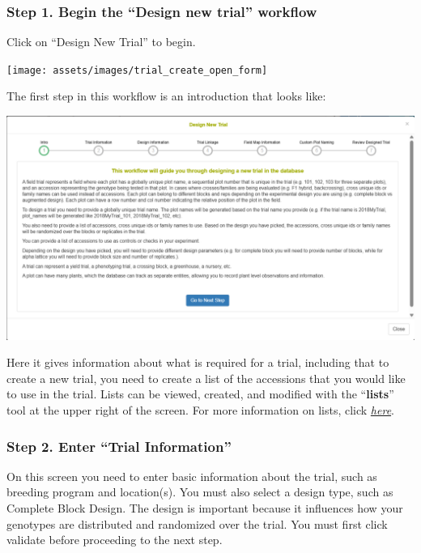 \documentclass[
  12pt,
]{book}
\begin{document}
\hypertarget{step-1.-begin-the-design-new-trial-workflow}{%
\subsubsection*{Step 1. Begin the ``Design new trial'' workflow}\label{step-1.-begin-the-design-new-trial-workflow}}


Click on ``Design New Trial'' to begin.

\begin{center}\texttt{[image: assets/images/trial\_create\_open\_form]} \end{center}

The first step in this workflow is an introduction that looks like:

\begin{center}\includegraphics[width=0.95\linewidth]{assets/images/trial_create_form_1} \end{center}

Here it gives information about what is required for a trial, including that to create a new trial, you need to create a list of the accessions that you would like to use in the trial. Lists can be viewed, created, and modified with the ``\textbf{lists}'' tool at the upper right of the screen. For more information on lists, click \protect\hyperlink{working-with-lists}{\emph{here}}.

\hypertarget{step-2.-enter-trial-information}{%
\subsubsection*{Step 2. Enter ``Trial Information''}\label{step-2.-enter-trial-information}}


On this screen you need to enter basic information about the trial, such as breeding program and location(s). You must also select a design type, such as Complete Block Design. The design is important because it influences how your genotypes are distributed and randomized over the trial. You must first click validate before proceeding to the next step.
\end{document}
